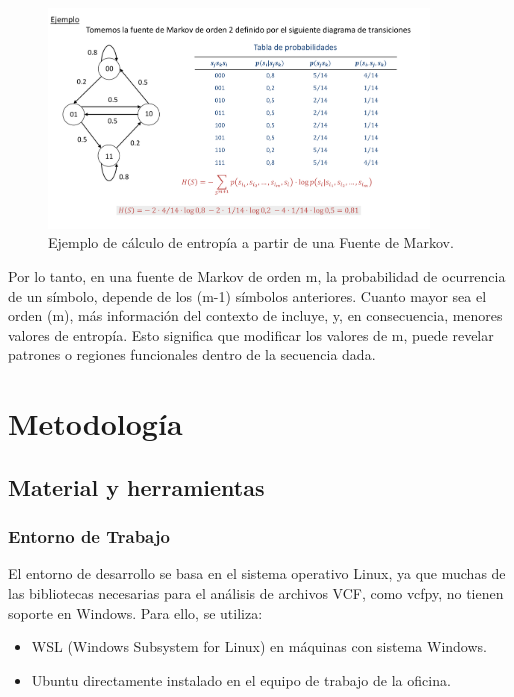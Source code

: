 \documentclass[11pt,spanish,listoffigures,listoftables]{tfgetsinf}
\begin{document}
\begin{figure}[H]
   \centering
   \includegraphics[width=0.9\textwidth]{entropia_markov.png}
   \caption{Ejemplo de cálculo de entropía a partir de una Fuente de Markov.}
   \label{fig:etiqueta_opcional}
\end{figure}


Por lo tanto, en una fuente de Markov de orden m, la probabilidad de ocurrencia de un símbolo, depende de los (m-1) símbolos anteriores. Cuanto mayor sea el orden (m), más información del contexto de incluye, y, en consecuencia, menores valores de entropía. Esto significa que modificar los valores de m, puede revelar patrones o regiones funcionales dentro de la secuencia dada. 

\chapter{Metodología}


\section{Material y herramientas}

\subsection{Entorno de Trabajo}

El entorno de desarrollo se basa en el sistema operativo Linux, ya que muchas de las bibliotecas necesarias para el análisis de archivos VCF, como vcfpy, no tienen soporte en Windows. Para ello, se utiliza:
\begin{itemize}
   \item WSL (Windows Subsystem for Linux) en máquinas con sistema Windows.
   \item Ubuntu directamente instalado en el equipo de trabajo de la oficina.
\end{itemize}
\end{document}
